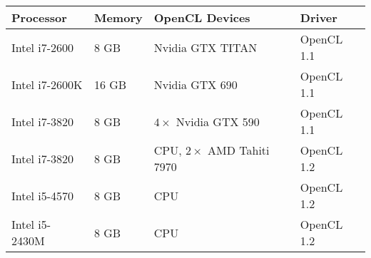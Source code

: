 \begin{tabular}{llll}
  \toprule
  Processor & Memory & OpenCL Devices & Driver \\
  \midrule
  Intel i7-2600 & 8 GB & Nvidia GTX TITAN & OpenCL 1.1 \\
  Intel i7-2600K & 16 GB & Nvidia GTX 690 & OpenCL 1.1 \\
  Intel i7-3820 & 8 GB &        $4\times$ Nvidia GTX 590 & OpenCL 1.1 \\
  Intel i7-3820 & 8 GB & CPU, $2\times$ AMD Tahiti 7970 & OpenCL 1.2 \\
  Intel i5-4570 & 8 GB & CPU & OpenCL 1.2 \\
  Intel i5-2430M & 8 GB & CPU & OpenCL 1.2 \\
  \bottomrule
\end{tabular}

